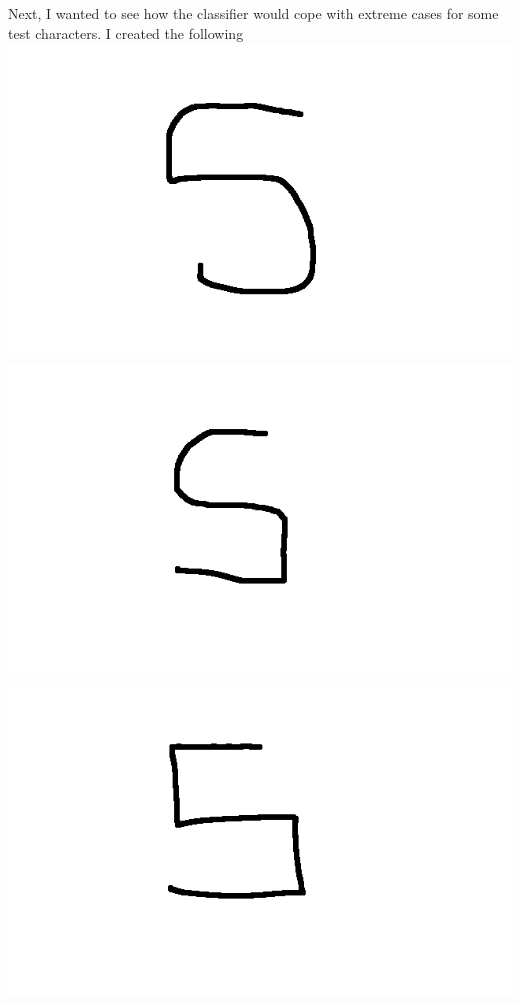 \documentclass[a4paper,12px,twocolumn]{article}
\begin{document}
\begin{flushleft}
    Next, I wanted to see how the classifier would cope with extreme cases for some test characters. I created the following
        \includegraphics[scale=0.1]{tS11}
        \includegraphics[scale=0.1]{tS12}
        \includegraphics[scale=0.1]{tS13}

\end{flushleft}
\end{document}
